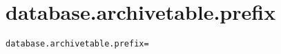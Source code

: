 \section{database.archivetable.prefix}
\label{configuration:DatabaseArchivetablePrefix}
\ClearAPI
\TODO
{}
\begin{lstlisting}[style=Props,caption={Usage example for \textit{database.archivetable.prefix}}]
database.archivetable.prefix=
\end{lstlisting}